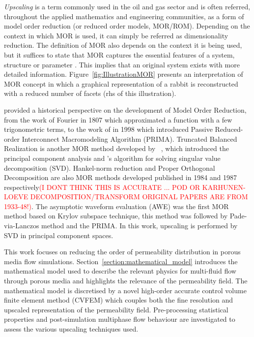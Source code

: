 \documentclass[preprint,12pt]{elsarticle}
\newcommand{\red}{\textcolor{red}}
\begin{document}
\medskip
{\it Upscaling} is a term commonly used in the oil and gas sector and is often referred, throughout the applied mathematics and engineering communities, as a form of model order reduction (or reduced order models, MOR/ROM). Depending on the context in which MOR is used, it can simply be referred as dimensionality reduction. The definition of MOR also depends on the context it is being used, but it suffices to state that MOR captures the essential features of a system, structure or parameter \cite{Schilders2008}. This implies that an original system exists with more detailed information. Figure~\ref{fig:IllustrationMOR} presents an interpretation of MOR concept in which a graphical representation of a rabbit is reconstructed with a reduced number of facets (rhs of this illustration).  

\citet{Schilders2008} provided a historical perspective on the development of Model Order Reduction, from the work of Fourier in 1807 which approximated a function with a few trigonometric terms, to the work of \citet{Odabasioglu_1998} in 1998 which introduced Passive Reduced-order Interconnect Macromodeling Algorithm (PRIMA). Truncated Balanced Realization  is another MOR method developed by \citeauthor{Moore_1981}~\cite{Moore_1981}, which introduced the principal component analysis \cite{Hotelling_1933} and \citeauthor{Golub1970}'s \cite{Golub1970} algorithm for solving singular value decomposition (SVD). Hankel-norm reduction \cite{Glover_1984} and Proper Orthogonal Decomposition \cite{Sirovich_1987} are also MOR methods developed published in 1984 and 1987 respectively\red{(I DONT THINK THIS IS ACCURATE ... POD OR KARHUNEN-LOEVE DECOMPOSITION/TRANSFORM ORIGINAL PAPERS ARE FROM 1933-48!)}. The asymptotic waveform evaluation (AWE) \cite{Pillage_1990} was the first MOR method based on Krylov subspace technique, this method was followed by Pade-via-Lanczos method \cite{Feldmann_1995} and the PRIMA. In this work, upscaling is performed by SVD in principal component spaces.

\bigskip
This work focuses on reducing the order of permeability distribution in porous media flow simulations. Section~\ref{section:mathematical_model} introduces the mathematical model used to describe the relevant physics for multi-fluid flow through porous media and highlights the relevance of the permeability field. The mathematical model is discretised by a novel high-order accurate control volume finite element method (CVFEM) \cite{gomes_2017} which couples both the fine resolution and upscaled representation of the permeability field. Pre-processing statistical properties and post-simulation multiphase flow behaviour are investigated to assess the various upscaling techniques used.
\end{document}
